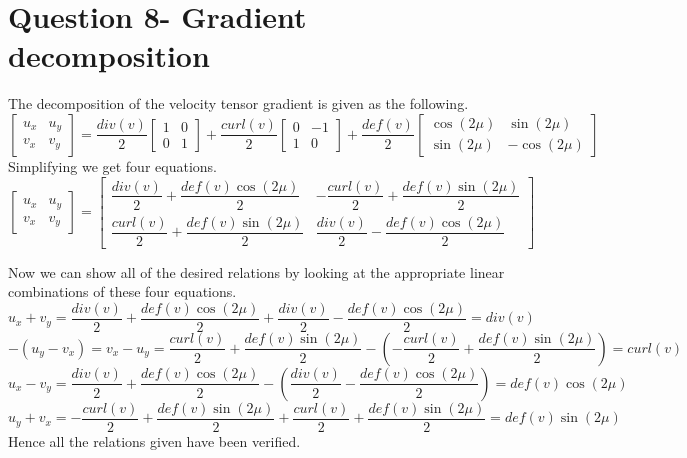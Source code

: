 \documentclass[12pt]{article}
\begin{document}
\section{Question 8- Gradient decomposition}
The decomposition of the velocity tensor gradient is given as the following.
$$\left[ \begin{matrix} u_{x}&u_{y}\\ v_{x}&v_{y}\end{matrix} \right] =\dfrac {div(v)} {2}\left[ \begin{matrix} 1& 0\\ 0& 1\end{matrix} \right] + \dfrac {curl(v)} {2}\left[ \begin{matrix} 0& -1\\ 1& 0\end{matrix} \right] + \dfrac {def(v)} {2}\left[ \begin{matrix} \cos (2\mu)& \sin(2\mu)\\ \sin(2\mu)& -\cos(2\mu)\end{matrix} \right]$$
Simplifying we get four equations.
$$ \left[ \begin{matrix} u_{x}&u_{y}\\ v_{x}&v_{y}\end{matrix} \right]  = \left[ \begin{matrix} \dfrac{div(v)}{2} + \dfrac{def(v)\cos(2\mu)}{2} & -\dfrac{curl(v)}{2}  + \dfrac{def(v)\sin(2\mu)}{2}\\[8pt] \dfrac{curl(v)}{2} + \dfrac{def(v)\sin(2\mu)}{2}&\dfrac{div(v)}{2}-\dfrac{def(v)\cos(2\mu)}{2}\end{matrix} \right]  $$

Now we can show all of the desired relations by looking at the appropriate linear combinations of these four equations.
$$u_x+v_y =\dfrac {div(v)} {2} +\dfrac{def(v)\cos(2\mu)}{2}+ \dfrac {div(v)} {2} - \dfrac{def(v)\cos(2\mu)}{2} = div(v)  $$
$$ -(u_y - v_x) = v_x-u_y = \dfrac {curl(v)} {2} + \dfrac{def(v)\sin(2\mu)}{2} -\left( -\dfrac {curl(v)} {2} + \dfrac{def(v)\sin(2\mu)}{2}  \right) = curl(v)$$
$$u_x-v_y=\dfrac {div(v)} {2} +\dfrac{def(v)\cos(2\mu)}{2} - \left(\dfrac {div(v)} {2} - \dfrac{def(v)\cos(2\mu)}{2} \right) = def(v)\cos(2\mu)$$
$$u_y+v_x= -\dfrac {curl(v)} {2} + \dfrac{def(v)\sin(2\mu)}{2} + \dfrac {curl(v)} {2} + \dfrac{def(v)\sin(2\mu)}{2} = def(v)\sin(2\mu) $$
Hence all the relations given have been verified.
\end{document}
